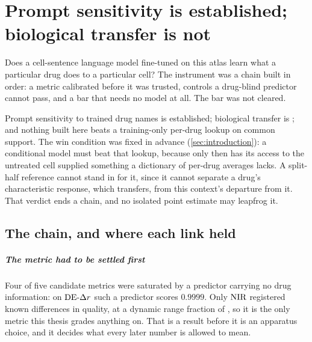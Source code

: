 
\chapter{Prompt sensitivity is established; biological transfer is not}
\label{sec:conclusions}

\begin{question}
Does a cell-sentence language model fine-tuned on this atlas learn what a
particular drug does to a particular cell? The instrument was a chain built in
order: a metric calibrated before it was trusted, controls a drug-blind
predictor cannot pass, and a bar that needs no model at all. The bar was not
cleared.
\end{question}

\noindent
Prompt sensitivity to trained drug names is established; biological transfer is
\notestablished; and nothing built here beats a training-only per-drug lookup on
common support. The win condition was fixed in advance
(\cref{sec:introduction}): a conditional model must beat that lookup, because
only then has its access to the untreated cell supplied something a dictionary
of per-drug averages lacks. A split-half reference cannot stand in for it, since
it cannot separate a drug's characteristic response, which transfers, from this
context's departure from it. That verdict ends a chain, and no isolated point
estimate may leapfrog it.

\section{The chain, and where each link held}

\paragraph{The metric had to be settled first} Four of five candidate metrics
were saturated by a predictor carrying no drug information: on $\textrm{DE-}\Delta r$ such a
predictor scores $0.9999$. Only $\textrm{NIR}$ registered known differences in quality,
at a dynamic range fraction of , so it is the only
metric this thesis grades anything on. That is a result before it is an
apparatus choice, and it decides what every later number is allowed to mean.

